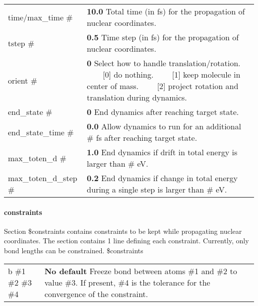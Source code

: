 \documentclass{report}
\newcommand{\tabitem}{~~\llap{--}~~}
\begin{document}
\begin{tabularx}{\textwidth}{ m{3.5cm} X }
time/max\_time \#	&
	\textbf{10.0} \newline
	Total time (in fs) for the propagation of nuclear coordinates.  \\

tstep \#		&
	\textbf{0.5} \newline
	Time step (in fs) for the propagation of nuclear coordinates.  \\

orient \#		&
	\textbf{0} \newline
	Select how to handle translation/rotation. \newline
	\tabitem [0] do nothing. \newline
	\tabitem [1] keep molecule in center of mass. \newline
	\tabitem [2] project rotation and translation during dynamics. \\

end\_state \#		&
	\textbf{0} \newline
	End dynamics after reaching target state. \\

end\_state\_time \#	&
	\textbf{0.0} \newline
	Allow dynamics to run for an additional \# fs after reaching target state. \\

max\_toten\_d \#	&
	\textbf{1.0} \newline
	End dynamics if drift in total energy is larger than \# eV. \\

max\_toten\_d\_step \#	&
	\textbf{0.2} \newline
	End dynamics if change in total energy during a single step is larger than \# eV. \\
\end{tabularx}


\paragraph{constraints}
Section \$constraints contains constraints to be kept while propagating nuclear coordinates. The section contains 1 line defining each constraint. Currently, only bond lengths can be constrained. \newline
\$constraints

\begin{tabularx}{\textwidth}{ m{2.5cm} X }
b \#1 \#2 \#3 \#4		&
	\textbf{No default} \newline
	Freeze bond between atoms \#1 and \#2 to value \#3. If present, \#4 is the tolerance for the convergence of the constraint.  \\

\end{tabularx}
\end{document}
